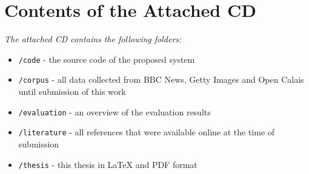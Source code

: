 \documentclass[11pt,a4paper,twoside]{article}
\begin{document}

\cleardoublepage
\fancyhead[LE,RO,LO,RE]{} %
\section*{Contents of the Attached CD}

\emph{The attached CD contains the following folders:}

\begin{itemize}
    \item \lstinline{/code} - the source code of the proposed system
    \item \lstinline{/corpus} - all data collected from BBC News, Getty Images and Open Calais until submission of this work
    \item \lstinline{/evaluation} - an overview of the evaluation results
    \item \lstinline{/literature} - all references that were available online at the time of submission
    \item \lstinline{/thesis} - this thesis in LaTeX and PDF format
\end{itemize}


\cleardoublepage








\end{document}
